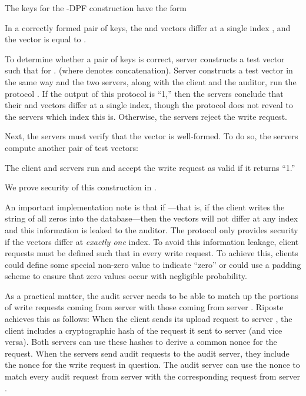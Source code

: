 \documentclass[10pt,twocolumn]{article}
\newcommand{\Name}{Riposte\xspace}
\begin{document}
\medskip

The keys for the -DPF construction 
have the form 

In a correctly formed pair of keys, the 
and  vectors differ at a single index ,
and the  vector is equal to 
.

To determine whether a pair of keys is correct,
server  constructs a test vector 
such that 
for .
(where  denotes concatenation).
Server  constructs a test vector 
in the same way and the two servers, along with
the client and 
the auditor, run the protocol .
If the output of this protocol is ``1,'' then the servers
conclude that their  and  vectors
differ at a single index, though the protocol
does not reveal to the servers which index this is.
Otherwise, the servers reject the write request.

Next, the servers must verify that the  vector
is well-formed.
To do so, the servers compute another pair of test vectors:

The client and servers run 
and accept the write request as valid if it returns ``1.''

We prove security of this construction in 
.

An important implementation note is that if ---that is, if the
client writes the string of all zeros into the database---then 
the  vectors will not differ at any index and this information
is leaked to the auditor.
The protocol only provides security if the vectors differ at {\em exactly one}
index.
To avoid this information leakage, client requests 
must be defined such that  in every write request.
To achieve this, clients could define some special non-zero value
to indicate ``zero'' or could use a padding scheme to ensure
that zero values occur with negligible probability.

As a practical matter, the audit server needs to be able to match up the
portions of write requests coming from server  with those coming from server
. \Name achieves this as follows: 
When the client sends its upload request to server , the client includes a
cryptographic hash of the request it sent to server  (and vice versa). 
Both servers can use these hashes to derive a common nonce for the request. 
When the servers send audit requests to the audit server, they include the nonce
for the write request in question. 
The audit server can use the 
nonce to match every audit request from server  with the corresponding request
from server . 

\medskip
\end{document}
